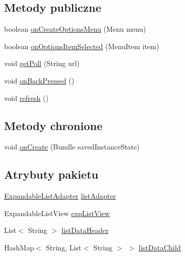 \subsection*{Metody publiczne}
\begin{DoxyCompactItemize}
\item 
boolean \hyperlink{classcom_1_1example_1_1qrpoll_1_1_poll_activity_a288dc770b6c610732839043961870030}{on\+Create\+Options\+Menu} (Menu menu)
\item 
boolean \hyperlink{classcom_1_1example_1_1qrpoll_1_1_poll_activity_afc58ce75d02a97bc6e93085c1c23281a}{on\+Options\+Item\+Selected} (Menu\+Item item)
\item 
void \hyperlink{classcom_1_1example_1_1qrpoll_1_1_poll_activity_aa474b030c95c180e2ac43c778c5e0fc9}{get\+Poll} (String url)
\item 
void \hyperlink{classcom_1_1example_1_1qrpoll_1_1_poll_activity_a651f26cfa36578fbf92012881d6a435b}{on\+Back\+Pressed} ()
\item 
void \hyperlink{classcom_1_1example_1_1qrpoll_1_1_poll_activity_a6c59d6b3beb1d5fea9899b0b0cb51e1f}{refresh} ()
\end{DoxyCompactItemize}
\subsection*{Metody chronione}
\begin{DoxyCompactItemize}
\item 
void \hyperlink{classcom_1_1example_1_1qrpoll_1_1_poll_activity_a9982a68e4862d0e8793e0a2e88373589}{on\+Create} (Bundle saved\+Instance\+State)
\end{DoxyCompactItemize}
\subsection*{Atrybuty pakietu}
\begin{DoxyCompactItemize}
\item 
\hyperlink{classcom_1_1example_1_1qrpoll_1_1_expandable_list_adapter}{Expandable\+List\+Adapter} \hyperlink{classcom_1_1example_1_1qrpoll_1_1_poll_activity_aeedb4d35f1bb56db80b834a5c5da4f44}{list\+Adapter}
\item 
Expandable\+List\+View \hyperlink{classcom_1_1example_1_1qrpoll_1_1_poll_activity_a45d9887fce62772f80726024d1775f7d}{exp\+List\+View}
\item 
List$<$ String $>$ \hyperlink{classcom_1_1example_1_1qrpoll_1_1_poll_activity_a62dde3c117f038e463aa7174906f5f7b}{list\+Data\+Header}
\item 
Hash\+Map$<$ String, List$<$ String $>$ $>$ \hyperlink{classcom_1_1example_1_1qrpoll_1_1_poll_activity_ab607bec81e729232d72cee9db8ffdc73}{list\+Data\+Child}
\end{DoxyCompactItemize}
